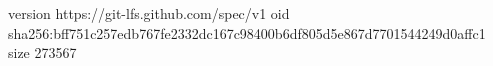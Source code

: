 version https://git-lfs.github.com/spec/v1
oid sha256:bff751c257edb767fe2332dc167c98400b6df805d5e867d7701544249d0affc1
size 273567
